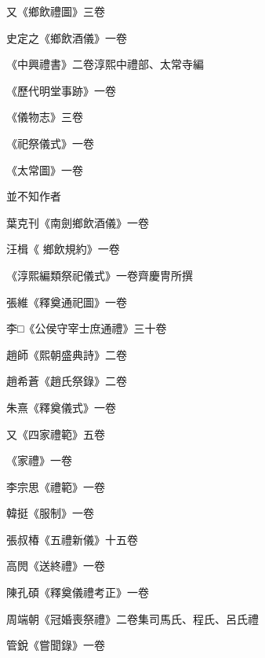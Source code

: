 \begin{pinyinscope}
 又《鄉飲禮圖》三卷



 史定之《鄉飲酒儀》一卷



 《中興禮書》二卷淳熙中禮部、太常寺編



 《歷代明堂事跡》一卷



 《儀物志》三卷



 《祀祭儀式》一卷



 《太常圖》一卷



 並不知作者



 葉克刊《南劍鄉飲酒儀》一卷



 汪楫《
 鄉飲規約》一卷



 《淳熙編類祭祀儀式》一卷齊慶冑所撰



 張維《釋奠通祀圖》一卷



 李□《公侯守宰士庶通禮》三十卷



 趙師《熙朝盛典詩》二卷



 趙希蒼《趙氏祭錄》二卷



 朱熹《釋奠儀式》一卷



 又《四家禮範》五卷



 《家禮》一卷



 李宗思《禮範》一卷



 韓挺《服制》一卷



 張叔椿《五禮新儀》十五卷



 高閌《送終禮》一卷



 陳孔碩《釋奠儀禮考正》一卷



 周端朝《冠婚喪祭禮》二卷集司馬氏、程氏、呂氏禮



 管銳《嘗聞錄》一卷




\end{pinyinscope}
